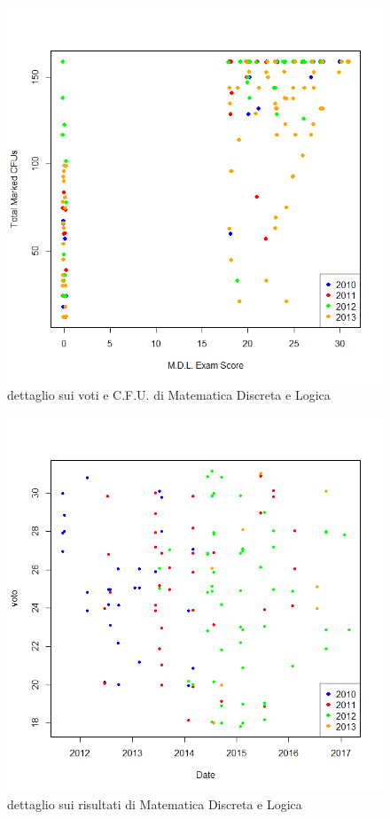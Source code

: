 \begin{figure}
    \centering
    \caption{dettaglio sui voti e C.F.U. di Matematica Discreta e Logica}
    \label{mdl}
	\includegraphics[scale=0.5]{img/scatter_plot_5.png}
\end{figure}

\begin{figure}
    \centering
    \caption{dettaglio sui risultati di Matematica Discreta e Logica}
    \label{mdl_2}
	\includegraphics[scale=0.5]{img/scatter_plot_9.png}
\end{figure}


